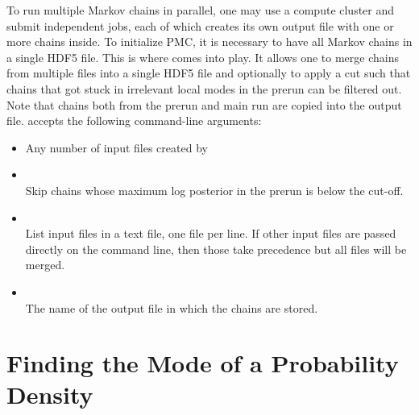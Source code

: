 To run multiple Markov chains in parallel, one may use a compute cluster and
submit independent jobs, each of which creates its own output file with one or
more chains inside. To initialize PMC, it is necessary to have all Markov chains
in a single HDF5 file. This is where  comes into play. It
allows one to merge chains from multiple files into a single HDF5 file and
optionally to apply a cut such that chains that got stuck in irrelevant local
modes in the prerun can be filtered out. Note that chains both from the prerun
and main run are copied into the output file.  accepts
the following command-line arguments:
\begin{itemize}
    \item[] Any number of input files created by \\[-3\medskipamount]
    \item[] \\[\medskipamount]
        Skip chains whose maximum log posterior in the prerun is below the cut-off.

    \item[] \\[\medskipamount]
        List input files in a text file, one file per line. If other input files are passed directly on the command line, then those take precedence but all files will be merged.

    \item[] \\[\medskipamount]
        The name of the output file in which the chains are stored.
\end{itemize}

\section{Finding the Mode of a Probability Density}
\label{sec:usage:eos-find-mode}

